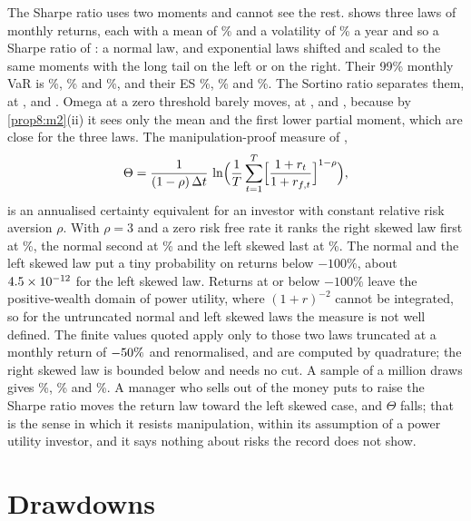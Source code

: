 \begin{chapterrefs}
The Sharpe ratio uses two moments and cannot see the rest.  shows three laws of
monthly returns, each with a mean of \thMu\% and a volatility of \thVol\% a year and so a Sharpe ratio
of \thSR: a normal law, and exponential laws shifted and scaled to the same moments with the long tail
on the left or on the right. Their 99\% monthly VaR is \thNormalVar\%, \thLeftVar\% and \thRightVar\%,
and their ES \thNormalEs\%, \thLeftEs\% and \thRightEs\%. The Sortino ratio separates them, at
\thNormalSo, \thLeftSo{} and \thRightSo. Omega at a zero threshold barely moves, at \thNormalOm,
\thLeftOm{} and \thRightOm, because by \cref{prop8:m2}(ii) it sees only the mean and the first lower
partial moment, which are close for the three laws. The manipulation-proof measure of
\textcite{goetzmann2007},
\begin{equation}\label{eq8:mppm}
  \Theta=\frac{1}{(1-\rho)\,\Delta t}\,\ln\Bigl(\frac1T\sum_{t=1}^{T}
  \Bigl[\frac{1+r_t}{1+r_{f,t}}\Bigr]^{1-\rho}\Bigr),
\end{equation}
is an annualised certainty equivalent for an investor with constant relative risk aversion $\rho$.
With $\rho=3$ and a zero risk free rate it ranks the right skewed law first at \thRightMp\%, the normal
second at \thNormalMp\% and the left skewed last at \thLeftMp\%. The normal and the left
skewed law put a tiny probability on returns below $-100\%$, about $4.5\times10^{-12}$ for the left skewed
law. Returns at or below $-100\%$ leave the positive-wealth domain of power utility, where
$(1+r)^{-2}$ cannot be integrated, so for the untruncated normal and left skewed laws the measure is
not well defined. The finite values quoted apply only to those two laws truncated at a monthly return
of $-50\%$ and renormalised, and are computed by quadrature; the right skewed law is bounded below
and needs no cut. A sample of a million
draws gives \thRightMpSample\%, \thNormalMpSample\% and \thLeftMpSample\%. A manager who sells out of the
money puts to raise the Sharpe ratio moves the return law toward the left skewed case, and $\Theta$
falls; that is the sense in which it resists manipulation, within its assumption of a power utility
investor, and it says nothing about risks the record does not show.

\FloatBarrier
\section{Drawdowns}
\label{sec8:drawdown}


\end{chapterrefs}
